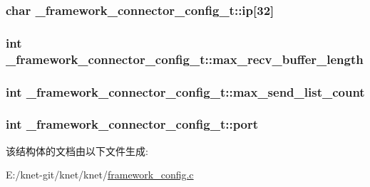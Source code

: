 \subsubsection[{ip}]{\setlength{\rightskip}{0pt plus 5cm}char \+\_\+framework\+\_\+connector\+\_\+config\+\_\+t\+::ip\mbox{[}32\mbox{]}}\label{a00013_a09a135e761eb026e64952e76ca193c1b_a09a135e761eb026e64952e76ca193c1b}
\hypertarget{a00013_a7f803ef991aaf690e9b3585c423511d1_a7f803ef991aaf690e9b3585c423511d1}{}
\subsubsection[{max\+\_\+recv\+\_\+buffer\+\_\+length}]{\setlength{\rightskip}{0pt plus 5cm}int \+\_\+framework\+\_\+connector\+\_\+config\+\_\+t\+::max\+\_\+recv\+\_\+buffer\+\_\+length}\label{a00013_a7f803ef991aaf690e9b3585c423511d1_a7f803ef991aaf690e9b3585c423511d1}
\hypertarget{a00013_ac6e964a4a4ca24a176016275955a4e05_ac6e964a4a4ca24a176016275955a4e05}{}
\subsubsection[{max\+\_\+send\+\_\+list\+\_\+count}]{\setlength{\rightskip}{0pt plus 5cm}int \+\_\+framework\+\_\+connector\+\_\+config\+\_\+t\+::max\+\_\+send\+\_\+list\+\_\+count}\label{a00013_ac6e964a4a4ca24a176016275955a4e05_ac6e964a4a4ca24a176016275955a4e05}
\hypertarget{a00013_a5427527be42630baf3fc0497e74e4d4d_a5427527be42630baf3fc0497e74e4d4d}{}
\subsubsection[{port}]{\setlength{\rightskip}{0pt plus 5cm}int \+\_\+framework\+\_\+connector\+\_\+config\+\_\+t\+::port}\label{a00013_a5427527be42630baf3fc0497e74e4d4d_a5427527be42630baf3fc0497e74e4d4d}


该结构体的文档由以下文件生成\+:\begin{DoxyCompactItemize}
\item 
E\+:/knet-\/git/knet/knet/\hyperlink{a00057}{framework\+\_\+config.\+c}\end{DoxyCompactItemize}
